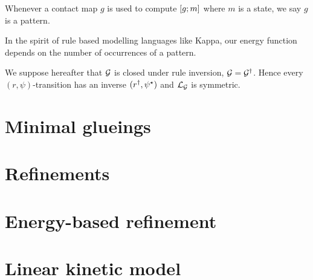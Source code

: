 

Whenever a contact map $g$ is used to compute $\left[g;m\right]$
where $m$ is a state, we say $g$ is a pattern.

In the spirit of rule based modelling languages like Kappa,
our energy function depends on the number of occurrences of a pattern.


We suppose hereafter that $\mathcal{G}$ is closed under
rule inversion, \ie $\mathcal{G} = \mathcal{G}^\dagger$.
Hence every $(r,\psi)$-transition
has an inverse $(r^\dagger,\psi^\star)$
and $\mathcal{L}_{\mathcal{G}}$ is symmetric.


\section{Minimal glueings}
\label{sec:mg}

\section{Refinements} %
\label{sec:gp}

\section{Energy-based refinement}
\label{sec:energy-gp}
\fi

\section{Linear kinetic model}
\label{sec:kinetic-model}




